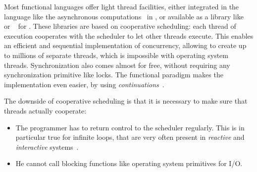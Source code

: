 \documentclass[9pt,preprint]{sigplanconf}
\begin{document}

Most functional languages offer light thread facilities, either integrated in the language like the asynchronous computations~\cite{Syme:2011} in \fsharp, or available as a library like \conhaskell~\cite{Jones:1996} or \lwt~\cite{Vouillon:2008} for \ocaml. These libraries are based on cooperative scheduling: each thread of execution cooperates with the scheduler to let other threads execute. This enables an efficient and sequential implementation of concurrency, allowing to create up to millions of separate threads, which is impossible with operating system threads. Synchronization also comes almost for free, without requiring any synchronization primitive like locks. The functional paradigm makes the implementation even easier, by using \emph{continuations}~\cite{Claessen:1999}.

The downside of cooperative scheduling is that it is necessary to make sure that threads actually cooperate:
\begin{itemize}
\item The programmer has to return control to the scheduler regularly. This is in particular true for infinite loops, that are very often present in \emph{reactive} and \emph{interactive} systems~\cite{Harel:1985}. 
\item He cannot call blocking functions like operating system primitives for I/O. 
\end{itemize}
\end{document}
